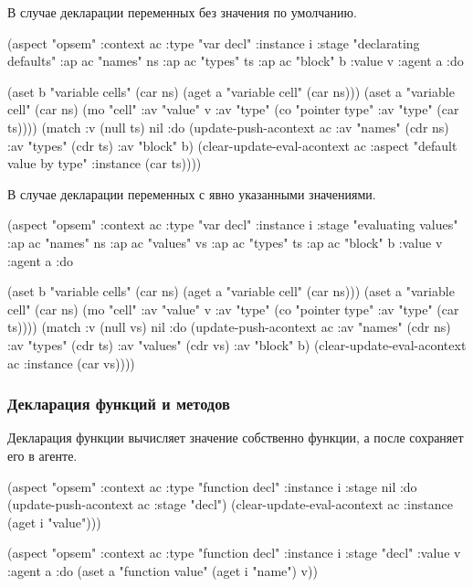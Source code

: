 \documentclass[12pt,twoside,russian]{article}
\begin{document}
В случае декларации переменных без значения по умолчанию.

\begin{ABMLCode}
(aspect "opsem" :context ac :type "var decl" :instance i 
  :stage "declarating defaults" :ap ac "names" ns :ap ac "types" ts 
  :ap ac "block" b :value v :agent a :do 
  
  (aset b "variable cells" (car ns) (aget a "variable cell" (car ns)))
  (aset a "variable cell" (car ns) 
    (mo "cell" :av "value" v 
               :av "type" (co "pointer type" :av "type" (car ts))))
  (match :v (null ts) nil :do 
  (update-push-acontext ac :av "names" (cdr ns) :av "types" (cdr ts) 
    :av "block" b)
  (clear-update-eval-acontext ac :aspect "default value by type" 
    :instance (car ts))))
\end{ABMLCode}

В случае декларации переменных с явно указанными значениями.

\begin{ABMLCode}
(aspect "opsem" :context ac :type "var decl" :instance i 
  :stage "evaluating values" :ap ac "names" ns :ap ac "values" vs 
  :ap ac "types" ts :ap ac "block" b :value v :agent a :do 
  
  (aset b "variable cells" (car ns) (aget a "variable cell" (car ns)))
  (aset a "variable cell" (car ns) (mo "cell" :av "value" v 
    :av "type" (co "pointer type" :av "type" (car ts))))
  (match :v (null vs) nil :do 
  (update-push-acontext ac :av "names" (cdr ns) :av "types" (cdr ts) 
    :av "values" (cdr vs) :av "block" b)
  (clear-update-eval-acontext ac :instance (car vs))))
\end{ABMLCode}


\subsubsection{Декларация функций и методов}
Декларация функции вычисляет значение собственно функции, а после сохраняет его в агенте.

\begin{ABMLCode}
(aspect "opsem" :context ac :type "function decl" :instance i 
  :stage nil :do 
  (update-push-acontext ac :stage "decl")
  (clear-update-eval-acontext ac :instance (aget i "value")))

(aspect "opsem" :context ac :type "function decl" :instance i 
  :stage "decl" :value v :agent a :do 
  (aset a "function value" (aget i "name") v))
\end{ABMLCode}
\end{document}
